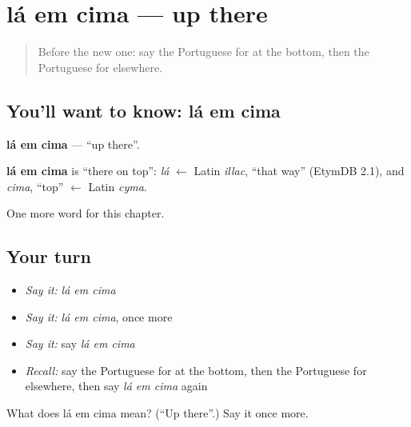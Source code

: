 \section[lá em cima]{lá em cima — up there}

\label{lesson:PT-C151-la-em-cima}



\begin{quote}
Before the new one: say the Portuguese for at the bottom, then the Portuguese for elsewhere.
\end{quote}

\subsection*{You'll want to know: lá em cima}
\textbf{lá em cima} — \textquotedblleft{}up there\textquotedblright{}.

\begin{cousinweb}
\textbf{lá em cima} is \textquotedblleft{}there on top\textquotedblright{}: \emph{lá} $\leftarrow$ Latin \emph{illac}, \textquotedblleft{}that way\textquotedblright{} (EtymDB 2.1), and \emph{cima}, \textquotedblleft{}top\textquotedblright{} $\leftarrow$ Latin \emph{cyma}.
\end{cousinweb}

\begin{grammarlens}[title={What you've built}]
One more word for this chapter.
\end{grammarlens}

\subsection*{Your turn}
\begin{itemize}
\raggedright
  \item \emph{Say it:} \emph{lá em cima}
  \item \emph{Say it:} \emph{lá em cima}, once more
  \item \emph{Say it:} say \emph{lá em cima}
  \item \emph{Recall:} say the Portuguese for at the bottom, then the Portuguese for elsewhere, then say \emph{lá em cima} again
\end{itemize}

\begin{tcolorbox}[breakable,colback=teal!4,colframe=teal!35!black,title={Before you move on}]
What does lá em cima mean? (\textquotedblleft{}Up there\textquotedblright{}.) Say it once more.
\end{tcolorbox}
